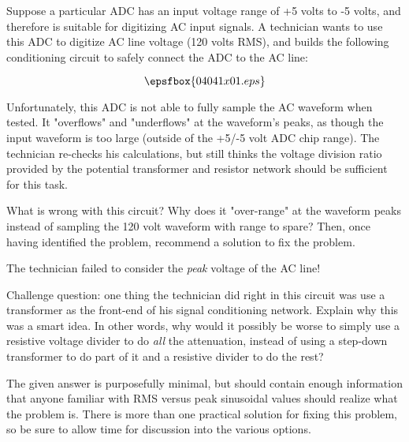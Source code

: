 

Suppose a particular ADC has an input voltage range of +5 volts to -5 volts, and therefore is suitable for digitizing AC input signals.  A technician wants to use this ADC to digitize AC line voltage (120 volts RMS), and builds the following conditioning circuit to safely connect the ADC to the AC line:

$$\epsfbox{04041x01.eps}$$

Unfortunately, this ADC is not able to fully sample the AC waveform when tested.  It "overflows" and "underflows" at the waveform's peaks, as though the input waveform is too large (outside of the +5/-5 volt ADC chip range).  The technician re-checks his calculations, but still thinks the voltage division ratio provided by the potential transformer and resistor network should be sufficient for this task.

What is wrong with this circuit?  Why does it "over-range" at the waveform peaks instead of sampling the 120 volt waveform with range to spare?  Then, once having identified the problem, recommend a solution to fix the problem.







The technician failed to consider the {\it peak} voltage of the AC line!

\vskip 10pt

Challenge question: one thing the technician did right in this circuit was use a transformer as the front-end of his signal conditioning network.  Explain why this was a smart idea.  In other words, why would it possibly be worse to simply use a resistive voltage divider to do {\it all} the attenuation, instead of using a step-down transformer to do part of it and a resistive divider to do the rest?







The given answer is purposefully minimal, but should contain enough information that anyone familiar with RMS versus peak sinusoidal values should realize what the problem is.  There is more than one practical solution for fixing this problem, so be sure to allow time for discussion into the various options.




